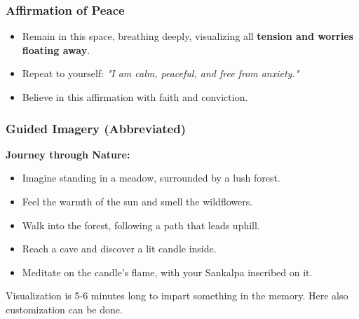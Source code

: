 \begin{frame}[fragile]\frametitle{Affirmation of Peace}
    \begin{itemize}
        \item Remain in this space, breathing deeply, visualizing all \textbf{tension and worries floating away}.
        \item Repeat to yourself: \textit{"I am calm, peaceful, and free from anxiety."}
        \item Believe in this affirmation with faith and conviction.
    \end{itemize}
\end{frame}


\begin{frame}[fragile]\frametitle{Guided Imagery (Abbreviated)}
    \textbf{Journey through Nature:}
    \begin{itemize}
        \item Imagine standing in a meadow, surrounded by a lush forest.
        \item Feel the warmth of the sun and smell the wildflowers.
        \item Walk into the forest, following a path that leads uphill.
        \item Reach a cave and discover a lit candle inside.
        \item Meditate on the candle's flame, with your Sankalpa inscribed on it.
    \end{itemize}
	
Visualization is 5-6 minutes long to impart something in the memory. Here also customization can be done.
	
\end{frame}

